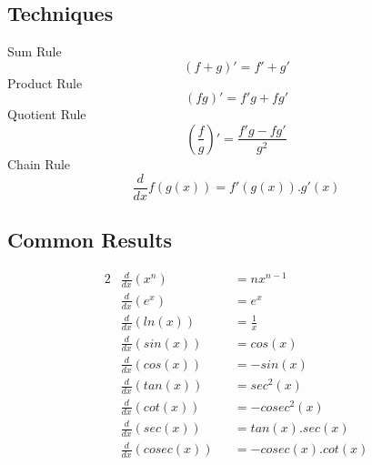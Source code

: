 \documentclass[11pt,a4paper]{article}
\begin{document}
\subsection{Techniques}
Sum Rule
$$(f+g)' = f' + g'$$
%
Product Rule
$$(fg)' = f'g + fg'$$
%
Quotient Rule
$$\left(\frac{f}{g}\right)' = \frac{f'g - fg'}{g^2}$$
%
Chain Rule
$$\frac{d}{dx} f(g(x)) = f'(g(x)).g'(x)$$

\subsection{Common Results}
\begin{alignat*}{2}
  &\frac{d}{dx}(x^n) &&= nx^{n-1} \\
  &\frac{d}{dx}(e^x) &&= e^x \\
  &\frac{d}{dx}(ln(x)) &&= \frac{1}{x}\\
  &\frac{d}{dx}(sin(x)) &&= cos(x) \\
  &\frac{d}{dx}(cos(x)) &&= -sin(x) \\
  &\frac{d}{dx}(tan(x)) &&= sec^2(x) \\
  &\frac{d}{dx}(cot(x)) &&= -cosec^2(x) \\
  &\frac{d}{dx}(sec(x)) &&= tan(x).sec(x) \\
  &\frac{d}{dx}(cosec(x)) &&= -cosec(x).cot(x) \\
\end{alignat*}
\end{document}
